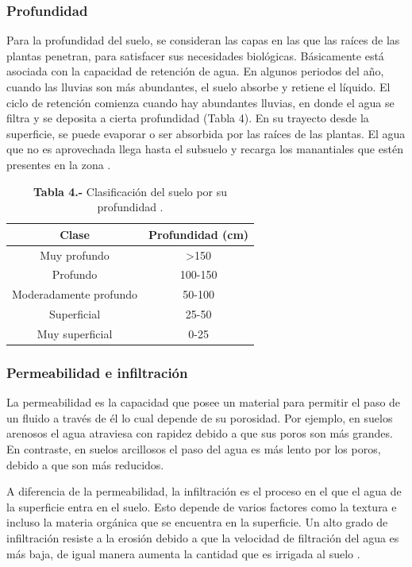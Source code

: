 \documentclass[12pt,letterpaper,oneside]{report}
\begin{document}
\subsubsection{Profundidad}
Para la profundidad del suelo, se consideran las capas en las que las raíces de las plantas penetran, para satisfacer sus necesidades biológicas. Básicamente está asociada con la capacidad de retención de agua. En algunos periodos del año, cuando las lluvias son más abundantes, el suelo absorbe y retiene el líquido. El ciclo de retención comienza cuando hay abundantes lluvias, en donde el agua se filtra y se deposita a cierta profundidad (Tabla 4). En su trayecto desde la superficie, se puede evaporar o ser absorbida por las raíces de las plantas. El agua que no es aprovechada llega hasta el subsuelo y recarga los manantiales que estén presentes en la zona \autocite{Lindbo2012,SSDS2017}.

\begin{table}[!h]
\begin{center}
\caption*{\textbf{Tabla 4.-} Clasificación del suelo por su profundidad \autocite{Lindbo2012}.}
\label{Tabla 4}
\begin{tabular}{cc}
\toprule[0.5mm]
Clase & Profundidad (cm) \\
\midrule
Muy profundo & >150 \\
Profundo & 100-150  \\
Moderadamente profundo & 50-100  \\
Superficial & 25-50  \\
Muy superficial & 0-25 \\
\bottomrule[0.5mm]
\end{tabular}
\end{center}
\end{table}
\newpage
\subsubsection{Permeabilidad e infiltración}
La permeabilidad es la capacidad que posee un material para permitir el paso de un fluido a través de él lo cual depende de su porosidad. Por ejemplo, en suelos arenosos el agua atraviesa con rapidez debido a que sus poros son más grandes. En contraste, en suelos arcillosos el paso del agua es más lento por los poros, debido a que son más reducidos.
\par
A diferencia de la permeabilidad, la infiltración es el proceso en el que el agua de la superficie entra en el suelo. Esto depende de varios factores como la textura e incluso la materia orgánica que se encuentra en la superficie. Un alto grado de infiltración resiste a la erosión debido a que la velocidad de filtración del agua es más baja, de igual manera aumenta la cantidad que es irrigada al suelo \autocite{SSDS2017}.
\end{document}
